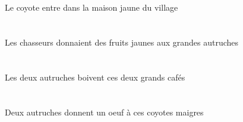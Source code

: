 \begin{exe}
   \DEFSgAbsP{}   \coyoteCSgAbsP{}    \DEFSgOblP{}    \DEFSgOblP{}   \villageCSgOblP{}   \DEP{}   \jauneDSgP{}   \maisonDSgOblP{}   \DANSP{}  \entrerViPrsCSgP{} \\
   \DEFSgAbsG{}   \coyoteCSgAbsG{}    \DEFSgOblG{}    \DEFSgOblG{}   \villageCSgOblG{}   \DEG{}   \jauneDSgG{}   \maisonDSgOblG{}   \DANSG{}  \entrerViPrsCSgG{} \\
 Le coyote entre dans la maison jaune du village
\ex\glll
   \DEFPlErg{}   \chasseurCPlErg{}    \DEFPlObl{}   \grandBPl{}   \autrucheBPlObl{}   \A{}   \INDPlAbs{}   \jauneAPl{}   \fruitAPlAbs{}  \donnerVdPstAPl{} \\
   \DEFPlErgP{}   \chasseurCPlErgP{}    \DEFPlOblP{}   \grandBPlP{}   \autrucheBPlOblP{}   \AP{}   \INDPlAbsP{}   \jauneAPlP{}   \fruitAPlAbsP{}  \donnerVdPstAPlP{} \\
   \DEFPlErgG{}   \chasseurCPlErgG{}    \DEFPlOblG{}   \grandBPlG{}   \autrucheBPlOblG{}   \AG{}   \INDPlAbsG{}   \jauneAPlG{}   \fruitAPlAbsG{}  \donnerVdPstAPlG{} \\
 Les chasseurs donnaient des fruits jaunes aux grandes autruches
\ex\glll
   \DEFDuErg{}   \autrucheBDuErg{}   \DEMDuAbs{}   \grandCDu{}   \cafeCDuAbs{}  \boireVtPrsCDu{} \\
   \DEFDuErgP{}   \autrucheBDuErgP{}   \DEMDuAbsP{}   \grandCDuP{}   \cafeCDuAbsP{}  \boireVtPrsCDuP{} \\
   \DEFDuErgG{}   \autrucheBDuErgG{}   \DEMDuAbsG{}   \grandCDuG{}   \cafeCDuAbsG{}  \boireVtPrsCDuG{} \\
 Les deux autruches boivent ces deux grands cafés
\ex\glll
   \INDDuErg{}   \autrucheBDuErg{}    \DEMPlDat{}   \maigreCPl{}   \coyoteCPlDat{}   \INDSgAbs{}   \oeufCSgAbs{}  \donnerVdPrsCSg{} \\
   \INDDuErgP{}   \autrucheBDuErgP{}    \DEMPlDatP{}   \maigreCPlP{}   \coyoteCPlDatP{}   \INDSgAbsP{}   \oeufCSgAbsP{}  \donnerVdPrsCSgP{} \\
   \INDDuErgG{}   \autrucheBDuErgG{}    \DEMPlDatG{}   \maigreCPlG{}   \coyoteCPlDatG{}   \INDSgAbsG{}   \oeufCSgAbsG{}  \donnerVdPrsCSgG{} \\
 Deux autruches donnent un oeuf à ces coyotes maigres
\ex\glll
   \INDSgAbs{}   \oeufCSgAbs{}    \DEFSgObl{}   \litDSgObl{}   \DANS{}  \tomberViPrsCSg{} \\
   \INDSgAbsP{}   \oeufCSgAbsP{}    \DEFSgOblP{}   \litDSgOblP{}   \DANSP{}  \tomberViPrsCSgP{} \\
   \INDSgAbsG{}   \oeufCSgAbsG{}    \DEFSgOblG{}   \litDSgOblG{}   \DANSG{}  \tomberViPrsCSgG{} \\

\end{exe}
